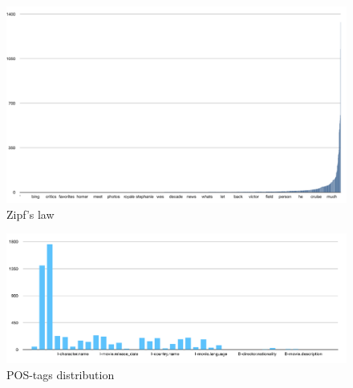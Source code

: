 \documentclass[11pt,a4paper]{article}
\begin{document}
\begin{figure}
  \includegraphics[width=\linewidth]{img/unigram.png}
  \caption{Zipf's law}
  \label{fig:unig}
\end{figure}

\begin{figure}
  \includegraphics[width=\linewidth]{img/pos.png}
  \caption{POS-tags distribution}
  \label{fig:pos}
\end{figure}
\end{document}
